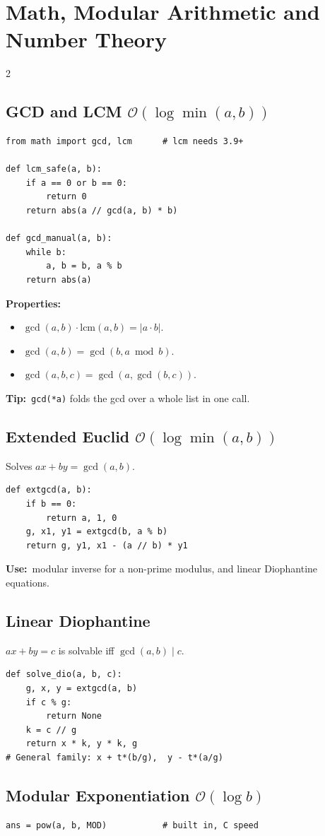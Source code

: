 \documentclass[10pt]{article}
\newcommand{\code}[1]{\texttt{\small #1}}
\newcommand{\sub}[2]{\subsection[#1]{#1\hspace{0.6em}%
  \textnormal{\color{accent2}\small$\mathcal{O}(#2)$}}}
\newcommand{\uses}[1]{{\color{accent2}\footnotesize\textbf{Use:}}~{\footnotesize #1}\par}
\newcommand{\tip}[1]{{\color{tipc}\footnotesize\textbf{Tip:}}~{\footnotesize #1}\par}
\begin{document}
\section{Math, Modular Arithmetic and Number Theory}
\begin{multicols}{2}

\sub{GCD and LCM}{\log \min(a,b)}
\begin{lstlisting}
from math import gcd, lcm      # lcm needs 3.9+

def lcm_safe(a, b):
    if a == 0 or b == 0:
        return 0
    return abs(a // gcd(a, b) * b)

def gcd_manual(a, b):
    while b:
        a, b = b, a % b
    return abs(a)
\end{lstlisting}
\textbf{Properties:}
\begin{itemize}
    \item $\gcd(a,b)\cdot\mathrm{lcm}(a,b) = |a\cdot b|$.
    \item $\gcd(a,b) = \gcd(b, a \bmod b)$.
    \item $\gcd(a,b,c) = \gcd(a, \gcd(b,c))$.
\end{itemize}
\tip{\code{gcd(*a)} folds the gcd over a whole list in one call.}

\sub{Extended Euclid}{\log \min(a,b)}
Solves $ax + by = \gcd(a,b)$.
\begin{lstlisting}
def extgcd(a, b):
    if b == 0:
        return a, 1, 0
    g, x1, y1 = extgcd(b, a % b)
    return g, y1, x1 - (a // b) * y1
\end{lstlisting}
\uses{modular inverse for a non-prime modulus, and linear Diophantine
equations.}

\subsection{Linear Diophantine}
$ax + by = c$ is solvable iff $\gcd(a,b) \mid c$.
\begin{lstlisting}
def solve_dio(a, b, c):
    g, x, y = extgcd(a, b)
    if c % g:
        return None
    k = c // g
    return x * k, y * k, g
# General family: x + t*(b/g),  y - t*(a/g)
\end{lstlisting}

\sub{Modular Exponentiation}{\log b}
\begin{lstlisting}
ans = pow(a, b, MOD)           # built in, C speed


\end{lstlisting}
\end{multicols}
\end{document}
